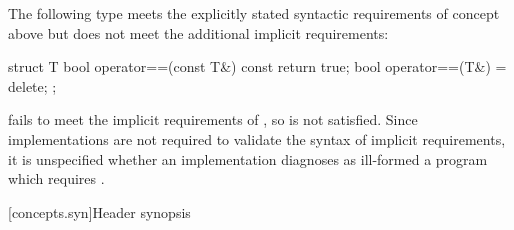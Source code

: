 \begin{example}
The following type  meets the explicitly stated syntactic requirements
of concept  above but does not meet the additional implicit
requirements:

\begin{codeblock}
struct T {
  bool operator==(const T&) const { return true; }
  bool operator==(T&) = delete;
};
\end{codeblock}

 fails to meet the implicit requirements of , so 
is not satisfied. Since implementations are not required to validate the syntax
of implicit requirements, it is unspecified whether an implementation diagnoses
as ill-formed a program which requires .
\end{example}

[concepts.syn]{Header  synopsis}


